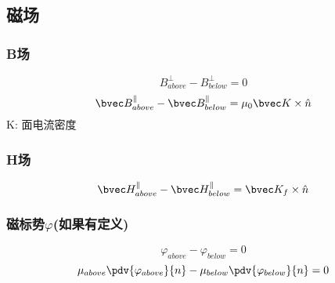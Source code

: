 \subsection{磁场}

\subsubsection{B场}
\begin{equation}
B^\perp_{above} - B^\perp_{below} = 0
\end{equation}
\begin{equation}
\bvec B^\parallel_{above} - \bvec B^\parallel_{below} = \mu_0\bvec K \times \hat n 
\end{equation}
K: 面电流密度
\subsubsection{H场}
\begin{equation}
\bvec H^\parallel_{above} - \bvec H^\parallel_{below} = \bvec K_f \times \hat n 
\end{equation}
\subsubsection{磁标势$\varphi$(如果有定义)}
\begin{equation}
\varphi_{above}-\varphi_{below}=0
\end{equation}
\begin{equation}
\mu_{above}\pdv{\varphi_{above}}{n} - \mu_{below}\pdv{\varphi_{below}}{n}  = 0
\end{equation}

